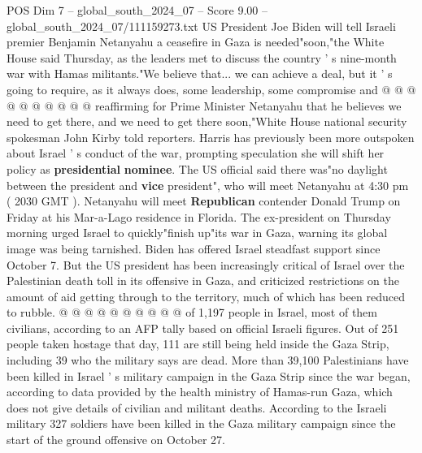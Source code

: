 \begin{textsample}{POS Dim 7 – global\_south\_2024\_07 – Score 9.00 – global\_south\_2024\_07/111159273.txt}
US President Joe Biden will tell Israeli premier Benjamin Netanyahu a ceasefire in Gaza is needed"soon,"the White House said Thursday, as the leaders met to discuss the country ' s nine-month war with Hamas militants."We believe that... we can achieve a deal, but it ' s going to require, as it always does, some leadership, some compromise and @ @ @ @ @ @ @ @ @ @ reaffirming for Prime Minister Netanyahu that he believes we need to get there, and we need to get there soon,"White House national security spokesman John Kirby told reporters.
Harris has previously been more outspoken about Israel ' s conduct of the war, prompting speculation she will shift her policy as \textbf{presidential} \textbf{nominee}.
The US official said there was"no daylight between the president and \textbf{vice} president", who will meet Netanyahu at 4:30 pm ( 2030 GMT ).
Netanyahu will meet \textbf{Republican} contender Donald Trump on Friday at his Mar-a-Lago residence in Florida.
The ex-president on Thursday morning urged Israel to quickly"finish up"its war in Gaza, warning its global image was being tarnished.
Biden has offered Israel steadfast support since October 7.
But the US president has been increasingly critical of Israel over the Palestinian death toll in its offensive in Gaza, and criticized restrictions on the amount of aid getting through to the territory, much of which has been reduced to rubble. @ @ @ @ @ @ @ @ @ @ of 1,197 people in Israel, most of them civilians, according to an AFP tally based on official Israeli figures.
Out of 251 people taken hostage that day, 111 are still being held inside the Gaza Strip, including 39 who the military says are dead.
More than 39,100 Palestinians have been killed in Israel ' s military campaign in the Gaza Strip since the war began, according to data provided by the health ministry of Hamas-run Gaza, which does not give details of civilian and militant deaths.
According to the Israeli military 327 soldiers have been killed in the Gaza military campaign since the start of the ground offensive on October 27.

\end{textsample}
